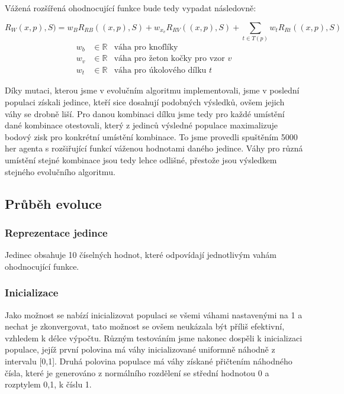 Vážená rozšířená ohodnocující funkce bude tedy vypadat následovně:

\begin{equation}
R_W(x,p),S) = w_BR_{RB}((x,p),S) + w_{x_v} R_{RV}((x,p),S) + \sum_{t\in T(p)}w_tR_{Rt}((x,p),S)
\end{equation}
\begin{align*}
    w_b &\in \mathbb{R}      &\text{váha pro knoflíky}  \\
    w_v &\in \mathbb{R}      &\text{váha pro žeton kočky pro vzor $v$}   \\
    w_t &\in \mathbb{R}      &\text{váha pro úkolového dílku $t$}  
\end{align*}

Díky mutaci, kterou jsme v evolučním algoritmu implementovali, jsme v poslední populaci získali jedince, kteří sice dosahují podobných výsledků, ovšem jejich váhy se drobně liší. Pro danou kombinaci dílku jsme tedy pro každé umístění dané kombinace otestovali, který z jedinců výsledné populace maximalizuje bodový zisk pro konkrétní umístění kombinace. To jsme provedli spuštěním 5000 her agenta s rozšiřující funkcí váženou hodnotami daného jedince.
Váhy pro různá umístění stejné kombinace jsou tedy lehce odlišné, přestože jsou výsledkem stejného evolučního algoritmu.

\subsection{Průběh evoluce}

\subsubsection*{Reprezentace jedince}
Jedinec obsahuje 10 číselných hodnot, které odpovídají jednotlivým vahám ohodnocující funkce.

\subsubsection*{Inicializace}

Jako možnost se nabízí inicializovat populaci se všemi váhami nastavenými na 1 a nechat je zkonvergovat, tato možnost se ovšem neukázala být příliš efektivní, vzhledem k délce výpočtu. Různým testováním jsme nakonec dospěli k inicializaci populace, jejíž první polovina má váhy inicializované uniformně náhodně z intervalu [0,1]. Druhá polovina populace má váhy získané přičtením náhodného čísla, které je generováno z normálního rozdělení se střední hodnotou 0 a rozptylem 0,1, k číslu 1.


